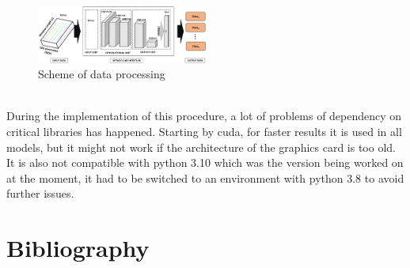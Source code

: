 ﻿\documentclass[10pt,a4paper,twocolumn,twoside]{article}
\begin{document}

\leavevmode\\

\begin{figure}[h]
  \caption{Scheme of data processing }
  \centering
  \includegraphics[width=0.5\textwidth]{img/FeatureProjectorModel.png}
\end{figure}
\leavevmode\\
During the implementation of this procedure, a lot of problems of dependency on critical libraries has happened. Starting by cuda, for faster results it is used in all models, but it might not work if the architecture of the graphics card is too old. It is also not compatible with python 3.10 which was the version being worked on at the moment, it had to be switched to an environment with python 3.8 to avoid further issues.
\\



\section{Bibliography}
\label{sec-bibliography}

\printbibliography

\end{document}
